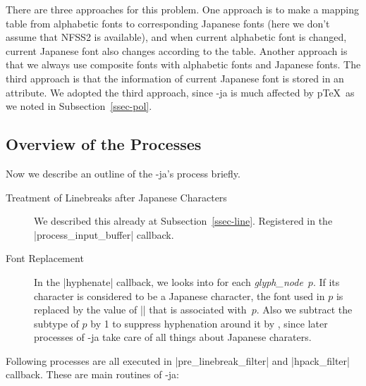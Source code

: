 \documentclass{ajt}
\begin{document}
There are three approaches for this problem. One approach is to make a
mapping table from alphabetic fonts to corresponding Japanese fonts
(here we don't assume that NFSS2 is available), and when current
alphabetic font is changed, current Japanese font also changes according
to the table.  Another approach is that we always use composite fonts
with alphabetic fonts and Japanese fonts. The third approach is that the
information of current Japanese font is stored in an attribute. We
adopted the third approach, since \LuaTeX-ja is much affected by p\TeX\
as we noted in Subsection~\ref{ssec-pol}.




\subsection{Overview of the Processes}
Now we describe an outline of the \LuaTeX-ja's process briefly.
\begin{description}
\item[Treatment of Linebreaks after Japanese Characters] We described
	   this already at Subsection~\ref{ssec-line}. Registered in the
	   |process_input_buffer| callback.
\item[Font Replacement] In the |hyphenate| callback, we looks into for
	   each \textit{glyph\_node}~$p$. If its character is considered
	   to be a Japanese character, the font used in $p$ is replaced
	   by the value of |\ltj@curjfnt| that is associated
	   with~$p$. Also we subtract the subtype of $p$ by 1 to
	   suppress hyphenation around it by \LuaTeX, since later
	   processes of \LuaTeX-ja take care of all things about
	   Japanese charaters.
\end{description}
%
Following processes are all executed in |pre_linebreak_filter| and |hpack_filter| callback. These are main routines of \LuaTeX-ja:
\end{document}

